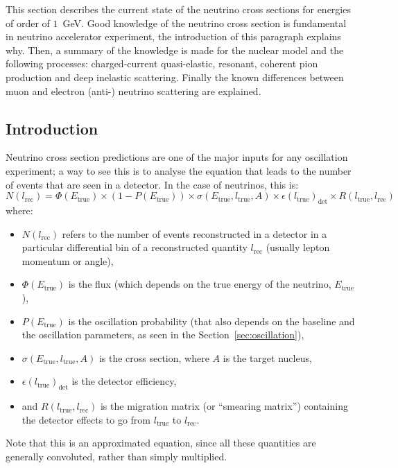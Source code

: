 
This section describes the current state of the neutrino cross
sections for energies of order of $1$~GeV. Good knowledge of the
neutrino cross section is fundamental in neutrino accelerator
experiment, the introduction of this paragraph explains why. Then, a
summary of the knowledge is made for the nuclear model and the
following processes: charged-current quasi-elastic, resonant, coherent
pion production and deep inelastic scattering. Finally the known
differences between muon and electron (anti-) neutrino scattering are
explained.

\subsection{Introduction}
\label{subsec:xsecintro}
Neutrino cross section predictions are one of the major inputs for any
oscillation experiment; a way to see this is to analyse the equation
that leads to the number of events that are seen in a detector. In the
case of neutrinos, this is:
\begin{equation}
  \label{eq:nevents}
  N(l_\text{rec})=\Phi(E_\text{true})\times \left(1-P(E_\text{true})\right)\times
  \sigma(E_\text{true}, l_\text{true}, A) \times
  \epsilon(l_\text{true})_\text{det} \times R(l_\text{true},
  l_\text{rec})
\end{equation}
where:
\begin{itemize}[noitemsep,topsep=0pt]
\item $N(l_\text{rec})$ refers to the number of events reconstructed
  in a detector in a particular differential bin of a reconstructed
  quantity $l_\text{rec}$ (usually lepton momentum or angle),
\item $\Phi(E_{\text{true}})$ is the flux (which depends on the true energy
  of the neutrino, $E_{\text{true}}$),
\item $P(E_\text{true})$ is the oscillation probability (that also
  depends on the baseline and the oscillation parameters, as seen in
  the Section~\ref{sec:oscillation}),
\item $\sigma(E_\text{true}, l_\text{true}, A)$ is the cross section,
  where $A$ is the target nucleus,
\item $\epsilon(l_\text{true})_\text{det}$ is the detector efficiency,
\item and $R(l_\text{true}, l_\text{rec})$ is the migration matrix (or
  ``smearing matrix'') containing the detector effects to go from
  $l_\text{true}$ to $l_\text{rec}$.
\end{itemize}
Note that this is an approximated equation, since all these quantities
are generally convoluted, rather than simply multiplied.

